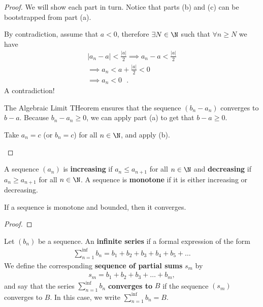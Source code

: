 \begin{proof}
	We will show each part in turn. Notice that parts (b) and (c) can be bootstrapped from part (a).
	\begin{alphabetize}
		\item By contradiction, assume that $a < 0 $, therefore $\exists N \in \N$ such that $\forall n \ge  N$ we have
	        	\begin{align}
       	        		\left|a_n - a\right| < \frac{\left|a\right|}{2} \implies a_n - a < \frac{\left|a\right|}{2} \\
                		\implies a_n < a + \frac{\left|a\right|}{2} < 0 \\
                		\implies a_n < 0 \text{ }.
        		\end{align}
        		A contradiction!
		\item The Algebraic Limit THeorem ensures that the sequence $\left( b_n - a_n \right) $ converges to $b - a$. Because $b_n - a_n \ge 0$, we can apply part (a) to get that $b - a \ge 0$.
		\item Take $a_n = c$ (or $b_n = c$) for all $n \in \N$, and apply (b).	
	\end{alphabetize}
\end{proof}

\begin{definition}
	A sequence $\left( a_n \right) $ is \textbf{increasing} if $a_n \le a_{n+1}$ for all $n \in \N$ and \textbf{decreasing} if $a_n \ge a_{n+1}$ for all $n \in \N$. A sequence is \textbf{monotone} if it is either increasing or decreasing.
\end{definition}

\begin{theorem}
	If a sequence is monotone and bounded, then it converges.
\end{theorem}

\begin{proof}
	
\end{proof}

\begin{definition}
	Let $\left( b_n \right) $ be a sequence. An \textbf{infinite series} if a formal expression of the form
	\begin{align}
		\sum_{n=1}^{\inf } b_n = b_1 + b_2 + b_3 + b_4 + b_5 + \ldots
	\end{align}
	We define the corresponding \textbf{sequence of partial sums} $s_m$ by
	\begin{align}
		s_m = b_1 + b_2 + b_3 + \ldots + b_m,
	\end{align}
	and say that the series $\sum_{n=1}^{\inf } b_n$ \textbf{converges to} $B$ if the sequence $\left( s_m \right) $ converges to $B$. In this case, we write $\sum_{n=1}^{\inf } b_n = B$. 
\end{definition}

